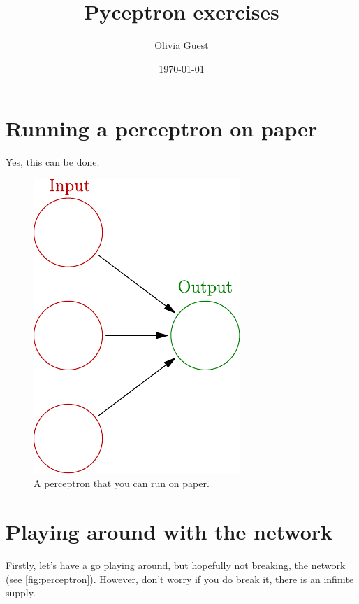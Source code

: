 \documentclass[a4paper,10pt]{article}
\title{Pyceptron exercises}
\author{Olivia Guest}
\date{\today}
\begin{document}
\maketitle
\section{Running a perceptron on paper}
Yes, this can be done. 

\begin{figure}[hb]
 \centering
 \includegraphics{../slides/fig/perceptron_empty.pdf}
 \caption{A perceptron that you can run on paper.}
 \label{fig:perceptron}
\end{figure}
\section{Playing around with the network}
Firstly, let's have a go playing around, but hopefully not breaking, the network (see \autoref{fig:perceptron}). However, don't worry if you do break it, there is an infinite supply.
\end{document}
